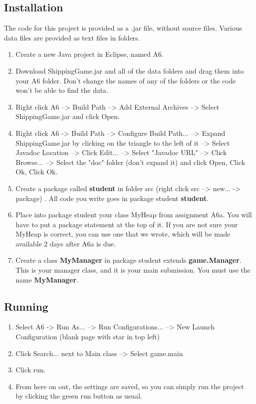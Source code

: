 \documentclass[11pt]{article}
\begin{document}
\subsection{Installation}
The code for this project is provided as a .jar file, without source files. Various data files are provided as text files in folders.
\begin{enumerate}
\item Create a new Java project in Eclipse, named A6.
\item Download ShippingGame.jar and all of the data folders and drag them into your A6 folder. Don't change the names of any of the folders or the code won't be able to find the data.
\item Right click A6 --> Build Path --> Add External Archives --> Select ShippingGame.jar and click Open.
\item Right click A6 -> Build Path --> Configure Build Path... --> Expand ShippingGame.jar by clicking on the triangle to the left of it --> Select Javadoc Location --> Click Edit... --> Select "Javadoc URL" --> Click Browse... --> Select the "doc" folder (don't expand it) and click Open, Click Ok, Click Ok.
\item Create a package called \textbf{student} in folder src (right click src --> new... -> package) . All code you write goes in package student \textbf{student}.
\item Place into package student your class MyHeap from assignment A6a. You will have to put a package statement at the top of it.
If you are not sure your MyHeap is correct, you can use one that we wrote, which will be made available 2 days after A6a is due.
\item Create a class \textbf{MyManager} in package student extends \textbf{game.Manager}. This is your manager class, and it is your main submission. You must use the name \textbf{MyManager}.
\end{enumerate}

\subsection{Running}
\begin{enumerate}
\item Select A6 -> Run As... --> Run Configurations... --> New Launch Configuration (blank page with star in top left)
\item Click Search... next to Main class --> Select game.main
\item Click run.
\item From here on out, the settings are saved, so you can simply run the project by clicking the green run button as usual.
\end{enumerate}
\end{document}
